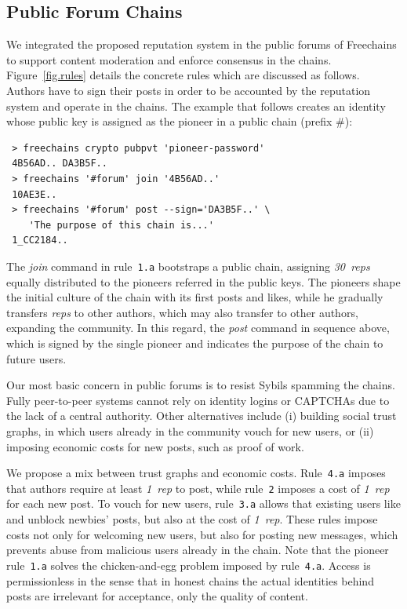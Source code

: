 \documentclass[10pt,journal,compsoc]{IEEEtran}
\newcommand{\FC}       {Freechains\xspace}
\newcommand{\reps}     {\emph{reps}\xspace}
\newcommand{\onerep}   {\emph{1~rep}\xspace}
\newcommand{\nreps}[1] {\emph{#1~reps\xspace}}
\begin{document}
\subsection{Public Forum Chains}
\label{sec.consensus.chains}

We integrated the proposed reputation system in the public forums of \FC to
support content moderation and enforce consensus in the chains.
Figure~\ref{fig.rules} details the concrete rules which are discussed as
follows.
Authors have to sign their posts in order to be accounted by the reputation
system and operate in the chains.
The example that follows creates an identity whose public key is assigned as
the pioneer in a public chain (prefix $\#$):

{\footnotesize
\begin{verbatim}
 > freechains crypto pubpvt 'pioneer-password'
 4B56AD.. DA3B5F..
 > freechains '#forum' join '4B56AD..'
 10AE3E..
 > freechains '#forum' post --sign='DA3B5F..' \
    'The purpose of this chain is...'
 1_CC2184..
\end{verbatim}
}

The \emph{join} command in rule~\texttt{1.a} bootstraps a public chain,
assigning \nreps{30} equally distributed to the pioneers referred in the public
keys.
The pioneers shape the initial culture of the chain with its first posts and
likes, while he gradually transfers \reps to other authors, which may also
transfer to other authors, expanding the community.
%
In this regard, the \emph{post} command in sequence above, which is signed by
the single pioneer and indicates the purpose of the chain to future users.

Our most basic concern in public forums is to resist Sybils spamming the
chains.
Fully peer-to-peer systems cannot rely on identity logins or CAPTCHAs due
to the lack of a central authority.
Other alternatives include (i) building social trust graphs, in which users
already in the community vouch for new users, or (ii) imposing economic costs
for new posts, such as proof of work.

We propose a mix between trust graphs and economic costs.
Rule~\texttt{4.a} imposes that authors require at least \onerep to post, while
rule~\texttt{2} imposes a cost of \onerep for each new post.
To vouch for new users, rule~\texttt{3.a} allows that existing users like and
unblock newbies' posts, but also at the cost of \onerep.
These rules impose costs not only for welcoming new users, but also for posting
new messages, which prevents abuse from malicious users already in the chain.
%
Note that the pioneer rule~\texttt{1.a} solves the chicken-and-egg problem
imposed by rule~\texttt{4.a}.
%
Access is permissionless in the sense that in honest chains the actual
identities behind posts are irrelevant for acceptance, only the quality of
content.
\end{document}
